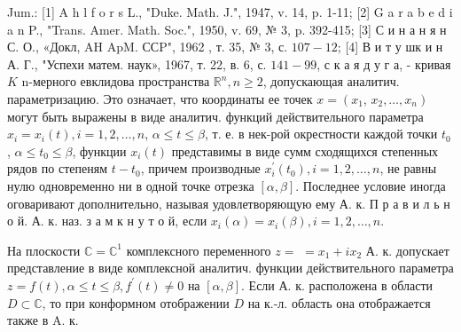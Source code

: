 \documentclass[10pt]{article}
\begin{document}
Jum.: [1] A h l f o r s L., "Duke. Math. J.", 1947, v. 14, p. 1-11; [2] G a r a b e d i a n P., "Trans. Amer. Math. Soc.", 1950, v. 69, № 3, p. 392-415; [3] С и н а н я н С. О., «Докл, AH ApM. ССP", 1962 , т. 35, № 3, с. $107-12$; [4] В и т у шк и н А. Г., "Успехи матем. наук», 1967, т. 22, в. 6, с. $141-99$, с к а я д у г а, - кривая $K$ n-мерного евклидова пространства $\mathbb{R}^{n}, n \geqslant 2$, допускающая аналитич. параметризацию. Это означает, что координаты ее точек $x=\left(x_{1}\right.$, $\left.x_{2}, \ldots, x_{n}\right)$ могут быть выражены в виде аналитич. функций действительного параметра $x_{i}=x_{i}(t), i=1,2, \ldots, n$, $\alpha \leqslant t \leqslant \beta$, т. е. в нек-рой окрестности каждой точки $t_{0}$, $\alpha \leqslant t_{0} \leqslant \beta$, функции $x_{i}(t)$ представимы в виде сумм сходящихся степенных рядов по степеням $t-t_{0}$, причем производные $x_{i}^{\prime}\left(t_{0}\right), i=1,2, \ldots, n$, не равны нулю одновременно ни в одной точке отрезка $[\alpha, \beta]$. Последнее условие иногда оговаривают дополнительно, называя удовлетворяющую ему А. к. П р а в и л ь н о й. А. к. наз. з а м к н у т о й, если $x_{i}(\alpha)=x_{i}(\beta), i=1,2, \ldots, n$.



На плоскости $\mathbb{C}=\mathbb{C}^{1}$ комплексного переменного $z=$ $=x_{1}+i x_{2}$ А. к. допускает представление в виде комплексной аналитич. функции действительного параметра $z=f(t), \alpha \leqslant t \leqslant \beta, f^{\prime}(t) \neq 0$ на $[\alpha, \beta]$. Если А. к. расположена в области $D \subset \mathbb{C}$, то при конформном отображении $D$ на к.-л. область она отображается также в A. к.
\end{document}

